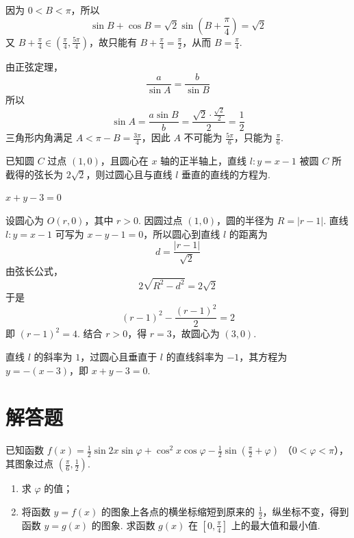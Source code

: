\begin{solution}
因为 \(0<B<\pi\)，所以
\[
\sin B+\cos B=\sqrt2\sin\left(B+\frac\pi4\right)=\sqrt2
\]
又 \(B+\frac\pi4\in\left(\frac\pi4,\frac{5\pi}{4}\right)\)，故只能有 \(B+\frac\pi4=\frac\pi2\)，从而 \(B=\frac\pi4\).

由正弦定理，
\[
\frac{a}{\sin A}=\frac{b}{\sin B}
\]
所以
\[
\sin A=\frac{a\sin B}{b}=\frac{\sqrt2\cdot\frac{\sqrt2}{2}}{2}=\frac12
\]
三角形内角满足 \(A<\pi-B=\frac{3\pi}{4}\)，因此 \(A\) 不可能为 \(\frac{5\pi}{6}\)，只能为 \(\frac\pi6\).
\end{solution}

\begin{problem}
已知圆 \(C\) 过点 \((1,0)\)，且圆心在 \(x\) 轴的正半轴上，直线 \(l: y = x - 1\) 被圆 \(C\) 所截得的弦长为 \(2\sqrt{2}\)，则过圆心且与直线 \(l\) 垂直的直线的方程为\fillinblank{}.
\end{problem}

\begin{answer}
\(x+y-3=0\)
\end{answer}

\begin{solution}
设圆心为 \(O(r,0)\)，其中 \(r>0\). 因圆过点 \((1,0)\)，圆的半径为 \(R=|r-1|\). 直线 \(l:y=x-1\) 可写为 \(x-y-1=0\)，所以圆心到直线 \(l\) 的距离为
\[
d=\frac{|r-1|}{\sqrt2}
\]
由弦长公式，
\[
2\sqrt{R^2-d^2}=2\sqrt2
\]
于是
\[
(r-1)^2-\frac{(r-1)^2}{2}=2
\]
即 \((r-1)^2=4\). 结合 \(r>0\)，得 \(r=3\)，故圆心为 \((3,0)\).

直线 \(l\) 的斜率为 \(1\)，过圆心且垂直于 \(l\) 的直线斜率为 \(-1\)，其方程为 \(y=-(x-3)\)，即 \(x+y-3=0\).
\end{solution}

\section{解答题}

\begin{problem}
已知函数 \( f(x) = \frac{1}{2} \sin 2x \sin \varphi + \cos^2 x \cos \varphi - \frac{1}{2} \sin \left( \frac{\pi}{2} + \varphi \right) \) （\(0 < \varphi < \pi\)），其图象过点 \( \left( \frac{\pi}{6}, \frac{1}{2} \right) \).
\begin{enumerate}
\item 求 \(\varphi\) 的值；
\item 将函数 \( y = f(x) \) 的图象上各点的横坐标缩短到原来的 \( \frac{1}{2} \)，纵坐标不变，得到函数 \( y = g(x) \) 的图象. 求函数 \( g(x) \) 在 \( \left[0, \frac{\pi}{4}\right] \) 上的最大值和最小值.
\end{enumerate}
\end{problem}


